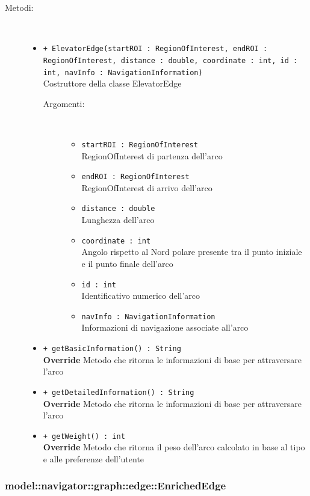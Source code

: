 \documentclass[../DefinizioneDiProdotto.tex]{subfiles}
\begin{document}
\begin{description}
\begin{itemize}
\end{itemize}
\item[Metodi:] \
\begin{itemize}
\item \texttt{+ ElevatorEdge(startROI : RegionOfInterest, endROI : RegionOfInterest, distance : double, coordinate : int, id : int, navInfo : NavigationInformation)}\\
Costruttore della classe ElevatorEdge
 \begin{description}
\item[Argomenti:] \
\begin{itemize}
\item \texttt{startROI : RegionOfInterest}\\
RegionOfInterest di partenza dell'arco\item \texttt{endROI : RegionOfInterest}\\
RegionOfInterest di arrivo dell'arco\item \texttt{distance : double}\\
Lunghezza dell'arco\item \texttt{coordinate : int}\\
Angolo rispetto al Nord polare presente tra il punto iniziale e il punto finale dell'arco\item \texttt{id : int}\\
Identificativo numerico dell'arco\item \texttt{navInfo : NavigationInformation}\\
Informazioni di navigazione associate all'arco\end{itemize}
\end{description}
\item \texttt{+ getBasicInformation() : String}\\
\textbf{Override} Metodo che ritorna le informazioni di base per attraversare l'arco
 \item \texttt{+ getDetailedInformation() : String}\\
\textbf{Override} Metodo che ritorna le informazioni di base per attraversare l'arco
 \item \texttt{+ getWeight() : int}\\
\textbf{Override} Metodo che ritorna il peso dell'arco calcolato in base al tipo e alle preferenze dell'utente
 \end{itemize}
\end{description}

\subsubsection{model::navigator::graph::edge::EnrichedEdge}
\end{document}
